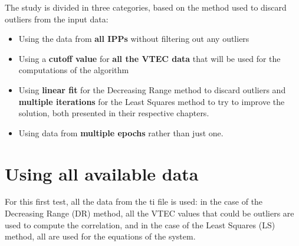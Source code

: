 The study is divided in three categories, based on the method used to discard outliers from the input data:

\begin{itemize}
	\item Using the data from \textbf{all IPPs} without filtering out any outliers
	\item Using a \textbf{cutoff value} for \textbf{all the VTEC data} that will be used for the computations of the algorithm
	\item Using \textbf{linear fit} for the Decreasing Range method to discard outliers and \textbf{multiple iterations} for the Least Squares method to try to improve the solution, both presented in their respective chapters.
	\item Using data from \textbf{multiple epochs} rather than just one.
\end{itemize}

\clearpage

\section{Using all available data}

For this first test, all the data from the ti file is used: in the case of the Decreasing Range (DR) method, all the VTEC values that could be outliers are used to compute the correlation, and in the case of the Least Squares (LS) method, all are used for the equations of the system.

